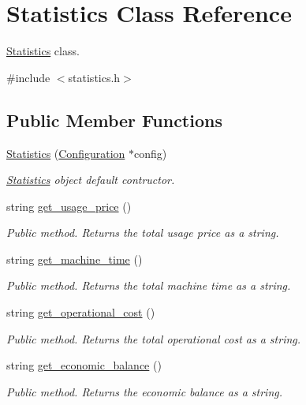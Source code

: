 \hypertarget{classStatistics}{}\section{Statistics Class Reference}
\label{classStatistics}


\hyperlink{classStatistics}{Statistics} class.  




{\ttfamily \#include $<$statistics.\+h$>$}

\subsection*{Public Member Functions}
\begin{DoxyCompactItemize}
\item 
\hyperlink{classStatistics_abf8cd294ac6cda2aeee639defc276702}{Statistics} (\hyperlink{classConfiguration}{Configuration} $\ast$config)
\begin{DoxyCompactList}\small\item\em \hyperlink{classStatistics}{Statistics} object default contructor. \end{DoxyCompactList}\item 
string \hyperlink{classStatistics_af4c128bde8bed27787f5ecdb08bf9929}{get\+\_\+usage\+\_\+price} ()
\begin{DoxyCompactList}\small\item\em Public method. Returns the total usage price as a string. \end{DoxyCompactList}\item 
string \hyperlink{classStatistics_afb354cc8fcd9ab43ec9c3d9e2880e660}{get\+\_\+machine\+\_\+time} ()
\begin{DoxyCompactList}\small\item\em Public method. Returns the total machine time as a string. \end{DoxyCompactList}\item 
string \hyperlink{classStatistics_a091d26462ea4db2b2a6032b94ff49a31}{get\+\_\+operational\+\_\+cost} ()
\begin{DoxyCompactList}\small\item\em Public method. Returns the total operational cost as a string. \end{DoxyCompactList}\item 
string \hyperlink{classStatistics_a20e75d62f6802875eec1ebd8424d84b1}{get\+\_\+economic\+\_\+balance} ()
\begin{DoxyCompactList}\small\item\em Public method. Returns the economic balance as a string. \end{DoxyCompactList}\item 

\end{DoxyCompactItemize}
